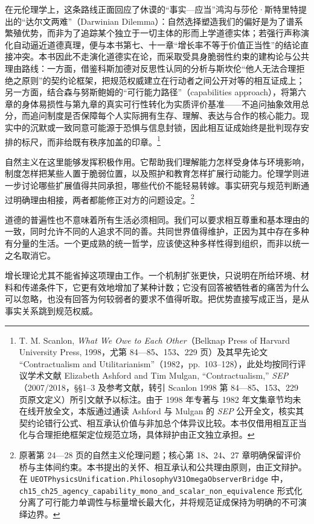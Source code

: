\documentclass[
  11pt,
  oneside]{book}
\begin{document}
在元伦理学上，这条路线正面回应了休谟的``事实---应当''鸿沟与莎伦·斯特里特提出的``达尔文两难''（Darwinian Dilemma）：自然选择塑造我们的偏好是为了谱系繁殖优势，而非为了追踪某个独立于一切主体的形而上学道德实体；若强行声称演化自动逼近道德真理，便与本书第七、十一章``增长率不等于价值正当性''的结论直接冲突。本书因此不走演化道德实在论，而采取受具身脆弱性约束的建构论与公共理由路线：一方面，借鉴科斯加德对反思性认同的分析与斯坎伦``他人无法合理拒绝之原则''的契约论框架，把规范权威建立在行动者之间公开对等的相互证成上；另一方面，结合森与努斯鲍姆的``可行能力路径''（capabilities approach），将第六章的身体易损性与第九章的真实可行性转化为实质评价基准------不追问抽象效用总分，而追问制度是否保障每个人实际拥有生存、理解、表达与合作的核心能力。现实中的沉默或一致同意可能源于恐惧与信息封锁，因此相互证成始终是批判现存安排的标尺，而非给既有秩序加盖的印章。\footnote{\hypertarget{ph-note-58}{}T. M. Scanlon, \emph{What We Owe to Each Other}（Belknap Press of Harvard University Press, 1998，尤第 84---85、153、229 页）及其早先论文 ``Contractualism and Utilitarianism''（1982，pp.~103--128），此处均按同行评议学术文献 Elizabeth Ashford and Tim Mulgan, ``Contractualism,'' \emph{SEP}（2007/2018，§§1--3 及参考文献，转引 Scanlon 1998 第 84---85、153、229 页原文定义）所引文献予以标注。由于 1998 年专著与 1982 年文集章节均未在线开放全文，本版通过通读 Ashford 与 Mulgan 的 \emph{SEP} 公开全文，核实其契约论错行公式、相互承认价值与非加总个体异议比较。本书仅借用相互正当化与合理拒绝框架定位规范立场，具体辩护由正文独立承担。}

自然主义在这里能够发挥积极作用。它帮助我们理解能力怎样受身体与环境影响，制度怎样把某些人置于脆弱位置，以及照护和教育怎样扩展行动能力。伦理学则进一步讨论哪些扩展值得共同承担，哪些代价不能轻易转嫁。事实研究与规范判断通过明确理由相接，两者都能修正对方的问题设定。\footnote{\hypertarget{ph-note-59}{}原著第 24---28 页的自然主义伦理问题；核心第 18、24、27 章明确保留评价桥与主体间约束。本书提出的关怀、相互承认和公共理由原则，由正文辩护。在 \nolinkurl{UEOTPhysicsUnification.PhilosophyV31OmegaObserverBridge} 中，\nolinkurl{ch15_ch25_agency_capability_mono_and_scalar_non_equivalence} 形式化分离了可行能力单调性与标量增长最大化，并将规范证成保持为明确的不可演绎边界。}

道德的普遍性也不意味着所有生活必须相同。我们可以要求相互尊重和基本理由的一致，同时允许不同的人追求不同的善。共同世界值得维护，正因为其中存在多种有分量的生活。一个更成熟的统一哲学，应该使这种多样性得到组织，而非以统一之名取消它。

增长理论尤其不能省掉这项理由工作。一个机制扩张更快，只说明在所给环境、材料和传递条件下，它更有效地增加了某种计数；它没有回答被牺牲者的痛苦为什么可以忽略，也没有回答为何较弱者的要求不值得听取。把优势直接写成正当，是从事实关系跳到规范权威。
\end{document}
